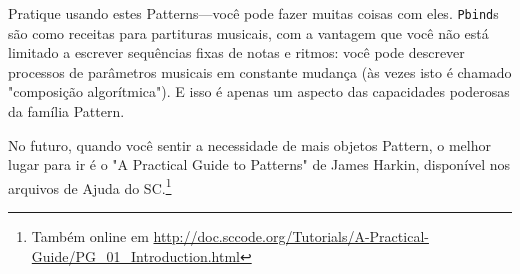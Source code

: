 Pratique usando estes Patterns---você pode fazer muitas coisas com eles. \texttt{Pbind}s são como receitas para partituras musicais, com a vantagem que você não está limitado a escrever sequências fixas de notas e ritmos: você pode descrever processos de parâmetros musicais em constante mudança (às vezes isto é chamado "composição algorítmica"). E isso é apenas um aspecto das capacidades poderosas da família Pattern.

No futuro, quando você sentir a necessidade de mais objetos Pattern, o melhor lugar para ir é o "A Practical Guide to Patterns" de James Harkin, disponível nos arquivos de Ajuda do SC.\footnote{Também online em \url{http://doc.sccode.org/Tutorials/A-Practical-Guide/PG_01_Introduction.html}}
